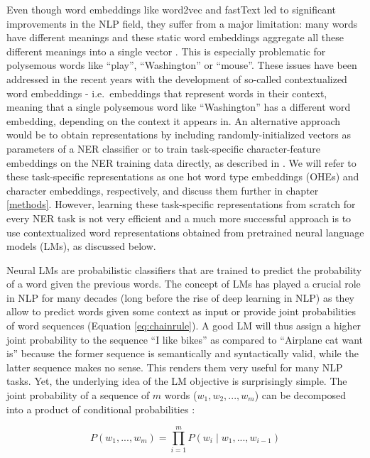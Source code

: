 \documentclass[12pt,a4paper,]{book}
\begin{document}
Even though word embeddings like word2vec and fastText led to significant improvements in the NLP field, they suffer from a major limitation: many words have different meanings and these static word embeddings aggregate all these different meanings into a single vector \citep{arora2018}. This is especially problematic for polysemous words like ``play'', ``Washington'' or ``mouse''. These issues have been addressed in the recent years with the development of so-called contextualized word embeddings - i.e.~embeddings that represent words in their context, meaning that a single polysemous word like ``Washington'' has a different word embedding, depending on the context it appears in. An alternative approach would be to obtain representations by including randomly-initialized vectors as parameters of a NER classifier or to train task-specific character-feature embeddings on the NER training data directly, as described in \citep{lample2016}. We will refer to these task-specific representations as one hot word type embeddings (OHEs) and character embeddings, respectively, and discuss them further in chapter \ref{methods}. However, learning these task-specific representations from scratch for every NER task is not very efficient and a much more successful approach is to use contextualized word representations obtained from pretrained neural language models (LMs), as discussed below.

Neural LMs are probabilistic classifiers that are trained to predict the probability of a word given the previous words. The concept of LMs has played a crucial role in NLP for many decades (long before the rise of deep learning in NLP) as they allow to predict words given some context as input or provide joint probabilities of word sequences (Equation \eqref{eq:chainrule}). A good LM will thus assign a higher joint probability to the sequence ``I like bikes'' as compared to ``Airplane cat want is'' because the former sequence is semantically and syntactically valid, while the latter sequence makes no sense. This renders them very useful for many NLP tasks. Yet, the underlying idea of the LM objective is surprisingly simple. The joint probability of a sequence of \(m\) words (\({w_1, w_2, ..., w_m}\)) can be decomposed into a product of conditional probabilities \citep{jurafsky2019}:

\begin{equation}
P\left(w_1, ..., w_m\right) = \prod_{i=1}^m P\left(w_i\mid w_1, ..., w_{i-1}\right)
\label{eq:chainrule}
\end{equation}
\end{document}
